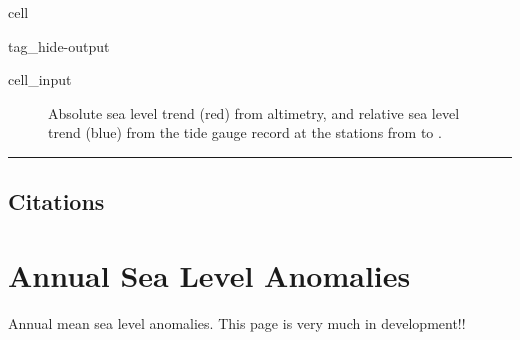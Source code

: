 \documentclass[letterpaper,10pt,english]{jupyterBook}
\begin{document}
\begin{sphinxuseclass}{cell}
\begin{sphinxuseclass}{tag_hide-output}
\begin{sphinxVerbatimInput}
\begin{sphinxuseclass}{cell_input}
\begin{sphinxVerbatim}[commandchars=\\\{\}]
  

    
  
\end{sphinxVerbatim}

\end{sphinxuseclass}\end{sphinxVerbatimInput}

\end{sphinxuseclass}
\end{sphinxuseclass}
\begin{figure}[htbp]
\centering
\capstart

\noindent{}
\caption{Absolute sea level trend (red) from altimetry, and relative sea level trend (blue) from the tide gauge record at the  stations from  to .}\label{\detokenize{notebooks/regional_and_local/SL_Trend:trend-fig}}\end{figure}


\bigskip\hrule\bigskip



\subsection{Citations}
\label{\detokenize{notebooks/regional_and_local/SL_Trend:citations}}
\sphinxstepscope


\section{Annual Sea Level Anomalies}
\label{\detokenize{notebooks/regional_and_local/SL_anomaly_annual:annual-sea-level-anomalies}}\label{\detokenize{notebooks/regional_and_local/SL_anomaly_annual::doc}}
\sphinxAtStartPar
Annual mean sea level anomalies. This page is very much in development!!
\end{document}
